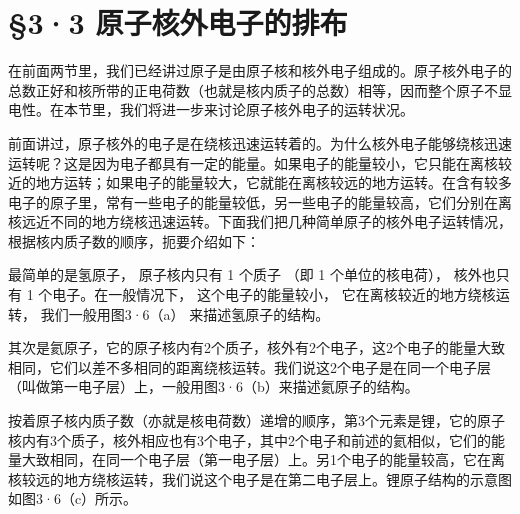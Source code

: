\section{§3·3 原子核外电子的排布}

在前面两节里，我们已经讲过原子是由原子核和核外电子组成的。原子核外电子的总数正好和核所带的正电荷数（也就是核内质子的总数）相等，因而整个原子不显电性。在本节里，我们将进一步来讨论原子核外电子的运转状况。

前面讲过，原子核外的电子是在绕核迅速运转着的。为什么核外电子能够绕核迅速运转呢？这是因为电子都具有一定的能量。如果电子的能量较小，它只能在离核较近的地方运转；如果电子的能量较大，它就能在离核较远的地方运转。在含有较多电子的原子里，常有一些电子的能量较低，另一些电子的能量较高，它们分别在离核远近不同的地方绕核迅速运转。下面我们把几种简单原子的核外电子运转情况，根据核内质子数的顺序，扼要介绍如下：

最简单的是氢原子， 原子核内只有 1 个质子 （即 1 个单位的核电荷），
核外也只有 1 个电子。在一般情况下， 这个电子的能量较小，
它在离核较近的地方绕核运转， 我们一般用图3·6（a） 来描述氢原子的结构。

其次是氦原子，它的原子核内有2个质子，核外有2个电子，这2个电子的能量大致相同，它们以差不多相同的距离绕核运转。我们说这2个电子是在同一个电子层（叫做第一电子层）上，一般用图3·6（b）来描述氦原子的结构。

按着原子核内质子数（亦就是核电荷数）递增的顺序，第3个元素是锂，它的原子核内有3个质子，核外相应也有3个电子，其中2个电子和前述的氦相似，它们的能量大致相同，在同一个电子层（第一电子层）上。另1个电子的能量较高，它在离核较远的地方绕核运转，我们说这个电子是在第二电子层上。锂原子结构的示意图如图3·6（c）所示。

